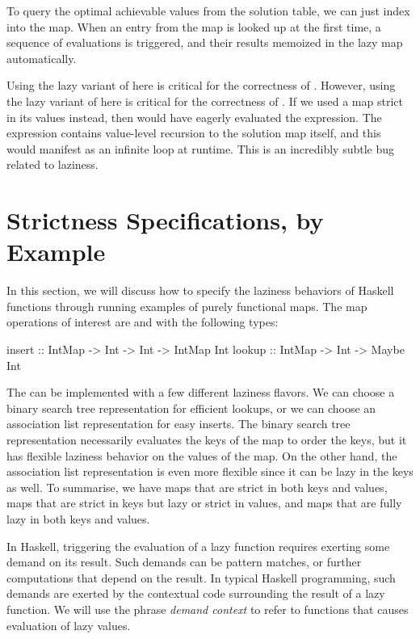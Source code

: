 \documentclass[acmsmall,review]{acmart}\settopmatter{}
\begin{document}
To query the optimal achievable values from the solution table, we can
just index into the map. When an entry from the map is looked up at
the first time, a sequence of evaluations is triggered, and their
results memoized in the lazy map automatically.

Using the lazy variant of  here is critical for the correctness
of .
However, using the lazy variant of  here is critical for the
correctness of . If we used a map strict in its values
instead, then  would have eagerly evaluated the 
expression. The  expression contains value-level recursion to
the solution map itself, and this would manifest as an infinite loop
at runtime. This is an incredibly subtle bug related to laziness.


\section{Strictness Specifications, by Example}
\label{sec:quickchick}
\iffalse
In this section, we will discuss how to specify the laziness behaviors
of Haskell functions through running examples of purely functional
maps. The map operations of interest are  and 
with the following types:
\begin{inlinecode}
insert :: IntMap -> Int -> Int -> IntMap Int
lookup :: IntMap -> Int        -> Maybe  Int
\end{inlinecode}
%
The  can be implemented with a few different laziness
flavors. We can choose a binary search tree representation for
efficient lookups, or we can choose an association list representation
for easy inserts. The binary search tree representation necessarily
evaluates the keys of the map to order the keys, but it has flexible
laziness behavior on the values of the map. On the other hand, the
association list representation is even more flexible since it can be
lazy in the keys as well. To summarise, we have maps that are strict
in both keys and values, maps that are strict in keys but lazy or
strict in values, and maps that are fully lazy in both keys and
values.

In Haskell, triggering the evaluation of a lazy function requires
exerting some demand on its result. Such demands can be pattern
matches, or further computations that depend on the result. In typical
Haskell programming, such demands are exerted by the contextual code
surrounding the result of a lazy function. We will use the
phrase \textit{demand context} to refer to functions that causes
evaluation of lazy values.
\end{document}
